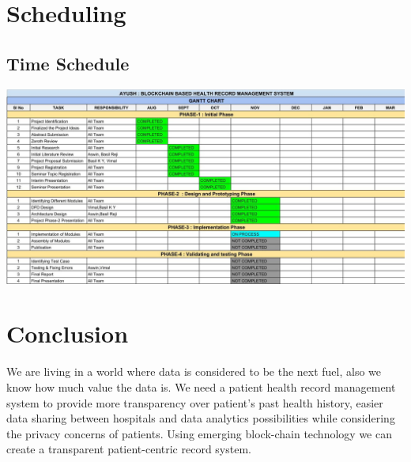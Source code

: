 \documentclass[11pt]{report}
\begin{document}
\chapter{Scheduling}
\section{Time Schedule}
\includegraphics[width=15cm]{Chart.jpeg}\newline
\chapter{Conclusion}
           We are living in a world where data is considered to be the next fuel, also we know how much
value the data is.  We need a patient health record management system to provide more transparency over patient’s past health history, easier data sharing between hospitals and data analytics possibilities while considering the privacy concerns of patients. Using emerging block-chain technology we can create a transparent patient-centric record system. 



\end{document}
